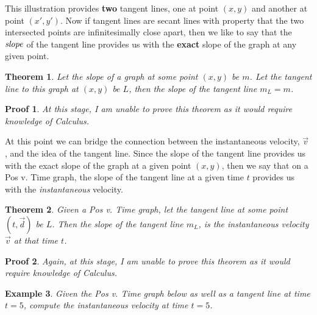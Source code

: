 \documentclass[12pt]{article}
\newcommand{\tx}[1]{\text{#1}}
\theoremstyle{break}
\newtheorem{thm}{Theorem}[subsection]
\newtheorem{ex}[thm]{Example}
\newtheorem*{pf}{Proof}
\begin{document}
This illustration provides \textbf{two} tangent lines, one at point $(x,y)$ and another at point $(x',y')$. Now if tangent lines are secant lines with property that the two intersected points are infinitesimally close apart, then we like to say that the $\emph{slope}$ of the tangent line provides us with the \textbf{exact} slope of the graph at any given point.

\begin{thm}
	Let the slope of a graph at some point $(x,y)$ be $m$. Let the tangent line to this graph at $(x,y)$ be $L$, then the slope of the tangent line $m_L = m$.
\end{thm}
\begin{pf}
At this stage, I am unable to prove this theorem as it would require knowledge of Calculus.
\end{pf}
At this point we can bridge the connection between the instantaneous velocity, $\vec v$ , and the idea of the tangent line. Since the slope of the tangent line provides us with the exact slope of the graph at a given point $(x,y)$, then we say that on a Pos v. Time graph, the slope of the tangent line at a given time $t$ provides us with the \emph{instantaneous} velocity. 
\begin{thm}
Given a Pos v. Time graph, let the tangent line at some point $(t, \vec d)$ be $L$. Then the slope of the tangent line $m_L$, is the instantaneous velocity $\vec v$ at that time $t$.
\end{thm}
\begin{pf}
Again, at this stage, I am unable to prove this theorem as it would require knowledge of Calculus.
\end{pf}
\begin{ex}
Given the Pos v. Time graph below as well as a tangent line at time $t = 5$, compute the instantaneous velocity at time $t = 5$.
\begin{center}
\end{center}
\end{ex}
\end{document}
